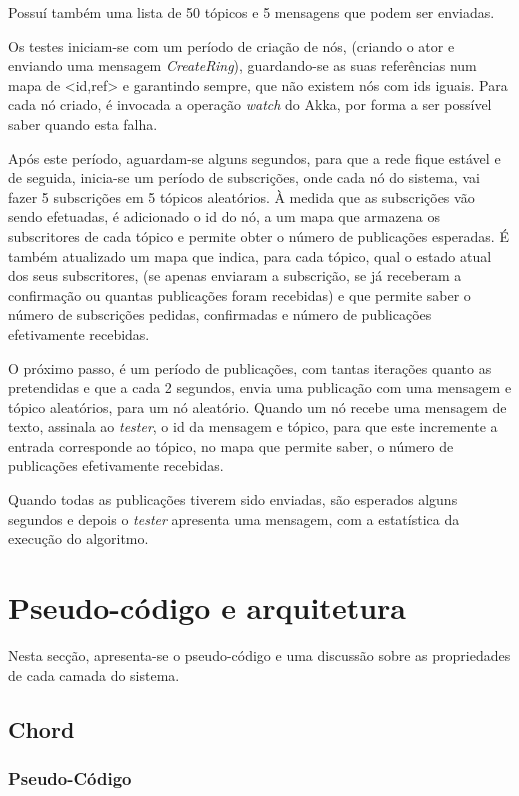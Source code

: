 \documentclass[12pt]{article}
\begin{document}
Possuí também uma lista de 50 tópicos e 5 mensagens que podem ser enviadas.

Os testes iniciam-se com um período de criação de nós, (criando o ator e enviando uma mensagem \emph{CreateRing}), guardando-se as suas referências num mapa de <id,ref> e garantindo sempre, que não existem nós com ids iguais. Para cada nó criado, é invocada a operação \emph{watch} do Akka, por forma a ser possível saber quando esta falha.

Após este período, aguardam-se alguns segundos, para que a rede fique estável e de seguida, inicia-se um período de subscrições, onde cada nó do sistema, vai fazer 5 subscrições em 5 tópicos aleatórios. À medida que as subscrições vão sendo efetuadas, é adicionado o id do nó, a um mapa que armazena os subscritores de cada tópico e permite obter o número de publicações esperadas. É também atualizado um mapa que indica, para cada tópico, qual o estado atual dos seus subscritores, (se apenas enviaram a subscrição, se já receberam a confirmação ou quantas publicações foram recebidas) e que permite saber o número de subscrições pedidas, confirmadas e número de publicações efetivamente recebidas.

O próximo passo, é um período de publicações, com tantas iterações quanto as pretendidas e que a cada 2 segundos, envia uma publicação com uma mensagem e tópico aleatórios, para um nó aleatório. Quando um nó recebe uma mensagem de texto, assinala ao \emph{tester}, o id da mensagem e tópico, para que este incremente a entrada corresponde ao tópico, no mapa que permite saber, o número de publicações efetivamente recebidas.

Quando todas as publicações tiverem sido enviadas, são esperados alguns segundos e depois o \emph{tester} apresenta uma mensagem, com a estatística da execução do algoritmo.

\newpage
\section{Pseudo-código e arquitetura}

Nesta secção, apresenta-se o pseudo-código e uma discussão sobre as propriedades de cada camada do sistema.

\subsection{Chord}

\subsubsection{Pseudo-Código}
\end{document}
